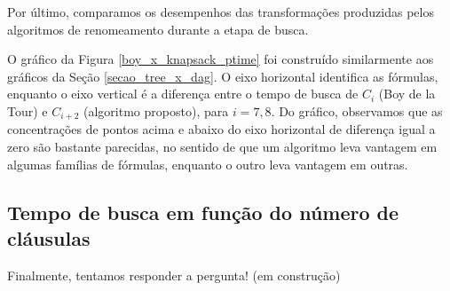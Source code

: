 
Por último, comparamos os desempenhos das transformações produzidas pelos algoritmos de renomeamento durante a etapa de busca.

O gráfico da Figura \ref{boy_x_knapsack_ptime} foi construído similarmente aos gráficos da Seção \ref{secao_tree_x_dag}. O eixo horizontal identifica as fórmulas, enquanto o eixo vertical é a diferença entre o tempo de busca de $C_i$ (Boy de la Tour) e $C_{i+2}$ (algoritmo proposto), para $i=7,8$. Do gráfico, observamos que as concentrações de pontos acima e abaixo do eixo horizontal de diferença igual a zero são bastante parecidas, no sentido de que um algoritmo leva vantagem em algumas famílias de fórmulas, enquanto o outro leva vantagem em outras.

\subsection{Tempo de busca em função do número de cláusulas}


\indent

Finalmente, tentamos responder a pergunta! (em construção)
